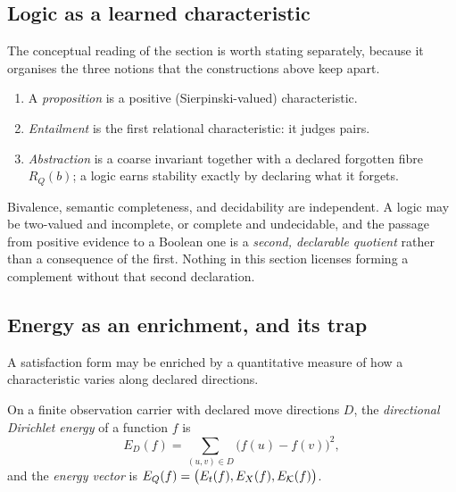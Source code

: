 \subsection{Logic as a learned characteristic}

The conceptual reading of the section is worth stating separately, because it organises
the three notions that the constructions above keep apart.

\begin{proposal}\label{prop:three-grades}
\begin{enumerate}
\item A \emph{proposition} is a positive (Sierpinski-valued) characteristic.
\item \emph{Entailment} is the first relational characteristic: it judges pairs.
\item \emph{Abstraction} is a coarse invariant together with a declared forgotten fibre
  $R_Q(b)$; a logic earns stability exactly by declaring what it forgets.
\end{enumerate}
\end{proposal}

\begin{warning}\label{warn:bivalence-completeness-decidability}
Bivalence, semantic completeness, and decidability are independent.  A logic may be
two-valued and incomplete, or complete and undecidable, and the passage from positive
evidence to a Boolean one is a \emph{second, declarable quotient} rather than a
consequence of the first.  Nothing in this section licenses forming a complement without
that second declaration.
\end{warning}

\subsection{Energy as an enrichment, and its trap}

A satisfaction form may be enriched by a quantitative measure of how a characteristic
varies along declared directions.

\begin{definition}\label{def:directional-energy}
On a finite observation carrier with declared move directions $D$, the
\emph{directional Dirichlet energy} of a function $f$ is
\[
  E_D(f)=\sum_{(u,v)\in D}\bigl(f(u)-f(v)\bigr)^{2},
\]
and the \emph{energy vector} is $E_Q(f)=\bigl(E_t(f),E_X(f),E_{\mathcal K}(f)\bigr)$.
\end{definition}

